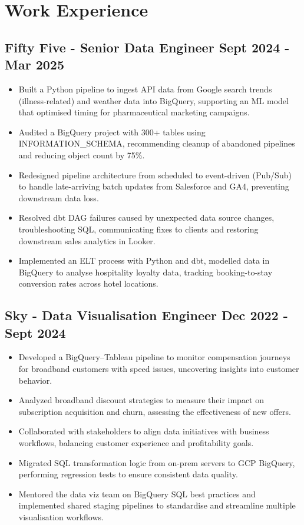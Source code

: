 \documentclass[a4paper, 10pt]{article}
\begin{document}
\vspace{-6.5mm}

\section*{Work Experience}

\subsection*{\textbf{Fifty Five - Senior Data Engineer} \hfill  Sept 2024 - Mar 2025}
\begin{itemize}[noitemsep]
    \item Built a Python pipeline to ingest API data from Google search trends (illness-related) and weather data into BigQuery, supporting an ML model that optimised timing for pharmaceutical marketing campaigns.
    \item Audited a BigQuery project with 300+ tables using INFORMATION\_SCHEMA, recommending cleanup of abandoned pipelines and reducing object count by 75\%.
    \item Redesigned pipeline architecture from scheduled to event-driven (Pub/Sub) to handle late-arriving batch updates from Salesforce and GA4, preventing downstream data loss.
    \item Resolved dbt DAG failures caused by unexpected data source changes, troubleshooting SQL, communicating fixes to clients and restoring downstream sales analytics in Looker.
    \item Implemented an ELT process with Python and dbt, modelled data in BigQuery to analyse hospitality loyalty data, tracking booking-to-stay conversion rates across hotel locations.
\end{itemize}

\subsection*{\textbf{Sky - Data Visualisation Engineer} \hfill  Dec 2022 - Sept 2024}
\begin{itemize}[noitemsep]
    \item Developed a BigQuery–Tableau pipeline to monitor compensation journeys for broadband customers with speed issues, uncovering insights into customer behavior.
    \item Analyzed broadband discount strategies to measure their impact on subscription acquisition and churn, assessing the effectiveness of new offers.
    \item Collaborated with stakeholders to align data initiatives with business workflows, balancing customer experience and profitability goals.
    \item Migrated SQL transformation logic from on-prem servers to GCP BigQuery, performing regression tests to ensure consistent data quality.
    \item Mentored the data viz team on BigQuery SQL best practices and implemented shared staging pipelines to standardise and streamline multiple visualisation workflows.
\end{itemize}
\end{document}
